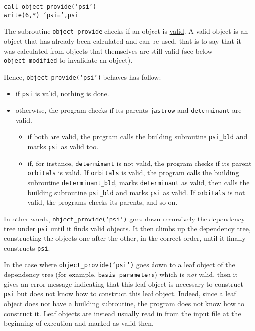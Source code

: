 \documentclass[a4paper,11pt]{article}
\newcommand\Def[1]{\underline{#1}}
\begin{document}
\vspace{0.5cm}
\noindent
{\tt call object_provide(`psi')\\
write(6,*) `psi=',psi}

\vspace{0.5cm}
The subroutine {\tt object_provide} checks if an object is \Def{valid}.
A valid object is an object that has already been calculated and can be used,
that is to say that it was calculated from objects that themselves are still valid
(see below {\tt object_modified} to invalidate an object).

Hence, {\tt object_provide(`psi')} behaves has follow:
\begin{itemize}
\item if {\tt psi} is valid, nothing is done. 
\item otherwise, the program checks if its parents {\tt jastrow} and {\tt determinant} are valid. 
\begin{itemize}
\item if both are valid, the program calls the building subroutine {\tt psi_bld} and marks {\tt psi} as valid too.
\item if, for instance, {\tt determinant} is not valid, the program checks if its parent {\tt orbitals} is valid.
      If {\tt orbitals} is valid, the program calls the building subroutine {\tt determinant_bld},
      marks {\tt determinant} as valid,
      then calls the building subroutine {\tt psi_bld} and marks {\tt psi} as valid.
      If {\tt orbitals} is not valid, the programs checks its parents, and so on.
\end{itemize}
\end{itemize}

In other words, {\tt object_provide(`psi')} goes down recursively the dependency tree under {\tt psi} until it finds valid objects. It then climbs up the dependency tree, constructing the objects one after the other, in the correct order, until it finally constructs {\tt psi}.

In the case where {\tt object_provide(`psi')} goes down to a leaf object of the dependency tree (for example, {\tt basis_parameters}) which is {\it not} valid, then it gives an error message indicating that this leaf object is necessary to construct {\tt psi} but does not know how to construct this leaf object. Indeed, since a leaf object does not have a building subroutine, the program does not know how to construct it. Leaf objects are instead usually read in from the input file at the beginning of execution and marked as valid then.
\end{document}
